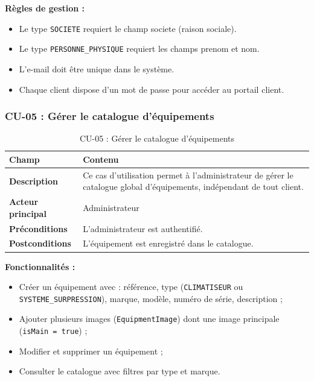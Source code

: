 \textbf{Règles de gestion :}
\begin{itemize}
    \item Le type \texttt{SOCIETE} requiert le champ societe (raison sociale).
    \item Le type \texttt{PERSONNE\_PHYSIQUE} requiert les champs prenom et nom.
    \item L'e-mail doit être unique dans le système.
    \item Chaque client dispose d'un mot de passe pour accéder au portail client.
\end{itemize}

\subsubsection{CU-05 : Gérer le catalogue d'équipements}

\begin{table}[H]
\centering
\caption{CU-05 : Gérer le catalogue d'équipements}
\label{tab:ch3:cu05}
\begin{tabular}{|p{3.5cm}|p{11cm}|}
\hline
\textbf{Champ} & \textbf{Contenu} \\
\hline
\textbf{Description}
  & Ce cas d'utilisation permet à l'administrateur de gérer le catalogue global d'équipements,
    indépendant de tout client. \\
\hline
\textbf{Acteur principal}
  & Administrateur \\
\hline
\textbf{Préconditions}
  & L'administrateur est authentifié. \\
\hline
\textbf{Postconditions}
  & L'équipement est enregistré dans le catalogue. \\
\hline
\end{tabular}
\end{table}

\textbf{Fonctionnalités :}
\begin{itemize}
    \item Créer un équipement avec : référence, type (\texttt{CLIMATISEUR} ou
          \texttt{SYSTEME\_SURPRESSION}), marque, modèle, numéro de série, description ;
    \item Ajouter plusieurs images (\texttt{EquipmentImage}) dont une image principale
          (\texttt{isMain = true}) ;
    \item Modifier et supprimer un équipement ;
    \item Consulter le catalogue avec filtres par type et marque.
\end{itemize}


